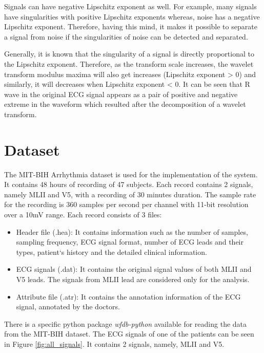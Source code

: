 Signals can have negative Lipschitz exponent as well. For example, many signals have singularities with positive Lipschitz exponents whereas, noise has a negative Lipschitz exponent. Therefore, having this mind, it makes it possible to separate a signal from noise if the singularities of noise can be detected and separated.

Generally, it is known that the singularity of a signal is directly proportional to the Lipschitz exponent. Therefore, as the transform scale increases, the wavelet transform modulus maxima will also get increases (Lipschitz exponent > 0) and similarly, it will decreases when Lipschitz exponent < 0. It can be seen that R wave in the original ECG signal appears as a pair of positive and negative extreme in the waveform which resulted after the decomposition of a wavelet transform.

\section{Dataset}

The MIT-BIH Arrhythmia dataset is used for the implementation of the system. It contains 48 hours of recording of 47 subjects. Each record contains 2 signals, namely MLII and V5, with a recording of 30 minutes duration. The sample rate for the recording is 360 samples per second per channel with 11-bit resolution over a 10mV range. Each record consists of 3 files:

\begin{itemize}
	\item Header file (.hea): It contains information such as the number of samples, sampling frequency, ECG signal format, number of ECG leads and their types, patient`s history and the detailed clinical information.
	
	\item ECG signals (.dat): It contains the original signal values of both MLII and V5 leads. The signals from MLII lead are considered only for the analysis.
	
	\item Attribute file (.atr): It contains the annotation information of the ECG signal, annotated by the doctors.
\end{itemize}

There is a specific python package \textit{wfdb-python} available for reading the data from the MIT-BIH dataset. The ECG signals of one of the patients can be seen in Figure \ref{fig:all_signals}. It contains 2 signals, namely, MLII and V5.


